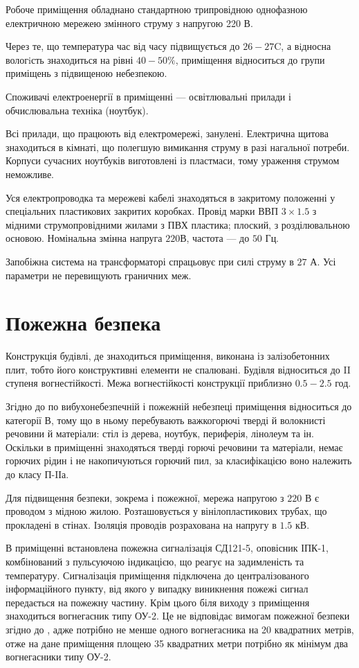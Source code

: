 Робоче приміщення обладнано стандартною трипровідною однофазною електричною
мережею змінного струму з напругою 220 В.

Через те, що температура час від часу підвищується до $26-27$C,
а вiдносна вологiсть знаходиться на рівні $40-50\%$,
приміщення відноситься до групи приміщень з підвищеною небезпекою.

Споживачі електроенергії в приміщенні --- освітлювальні прилади
і обчислювальна техніка (ноутбук).

Всі прилади, що працюють від електромережі, занулені.
Електрична щитова знаходиться в кімнаті,
що полегшую вимикання струму в разі нагальної потреби.
Корпуси сучасних ноутбуків виготовлені із пластмаси,
тому ураження струмом неможливе.

Уся електропроводка та мережеві кабелі знаходяться в закритому положенні
у спеціальних пластикових закритих коробках.
Провід марки ВВП $3\times 1.5$ з мідними струмопровідними жилами з ПВХ пластика;
плоский, з розділювальною основою.
Номінальна змінна напруга $220$В, частота --- до $50$ Гц.

Запобіжна система на трансформаторі спрацьовує при силі струму в $27$ А.
Усі параметри не перевищують граничних меж.

\section{Пожежна безпека}

Конструкція будівлі, де знаходиться приміщення, виконана із залізобетонних плит,
тобто його конструктивні елементи не спалювані.
Будівля відноситься до II ступеня вогнестійкості.
Межа вогнестійкості конструкції приблизно $0.5 - 2.5$ год.

Згідно до \cite{ONTP} по вибухонебезпечній і пожежній небезпеці приміщення
відноситься до категорії В, тому що в ньому перебувають важкогорючі тверді
й волокнисті речовини й матеріали: стіл із дерева, ноутбук, периферія, лінолеум
та ін.
Оскільки в приміщенні знаходяться тверді горючі речовини та матеріали,
немає горючих рідин і не накопичуються горючий пил,
за класифікацією воно належить до класу П-IІа.

Для підвищення безпеки, зокрема і пожежної, мережа напругою з $220$ В
є проводом з мідною жилою.
Розташовується у вінілопластикових трубах, що прокладені в стінах.
Ізоляція проводів розрахована на напругу в $1.5$ кВ. 

В приміщенні встановлена пожежна сигналізація СД121-5, оповісник ІПК-1,
комбінований з пульсуючою індикацією, що реагує на задимленість та температуру.
Сигналізація приміщення підключена до централізованого інформаційного пункту,
від якого у випадку виникнення пожежі сигнал передається на пожежну частину.
Крім цього біля виходу з приміщення знаходиться вогнегасник типу ОУ-2.
Це не відповідає вимогам пожежної безпеки згідно до \cite{PPBU},
адже потрібно не менше одного вогнегасника на 20 квадратних метрів,
отже на дане приміщення площею 35 квадратних метри потрібно як мінімум
два вогнегасники типу ОУ-2.

